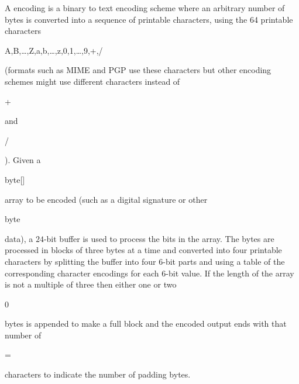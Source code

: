 \noindent
\begin{minipage}{95mm}
A  encoding is a binary to text encoding scheme where
an arbitrary number of bytes is converted into a sequence of printable
characters, using the 64 printable characters
\begin{code}A,B,\dots,Z,a,b,\dots,z,0,1,\dots,9,+,/\end{code}
(formats such as MIME and PGP use these characters but other encoding schemes might use
different characters instead of \begin{code}+\end{code} and \begin{code}/\end{code}).
Given a \begin{code}byte[]\end{code} array to be encoded (such as a digital signature
or other \begin{code}byte\end{code} data), a $24$-bit buffer is used to process the bits
in the array.
The bytes are processed in blocks of three bytes at a time and converted into four printable
characters by splitting the buffer into four $6$-bit parts and using a table of the
corresponding character encodings for each $6$-bit value.
If the length of the array is not a multiple of three then either one or two
\begin{code}0\end{code} bytes is appended to make a full block and the encoded
output ends with that number of \begin{code}=\end{code} characters
to indicate the number of padding bytes.
\end{minipage}
\hfill
